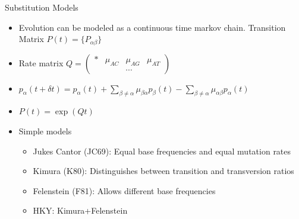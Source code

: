 \documentclass[10pt]{beamer}
\begin{document}
\begin{frame}[fragile]{Substitution Models}
\begin{itemize}
\item Evolution can be modeled as a continuous time markov chain. Transition Matrix $P(t) = \{P_{\alpha\beta}\}$
\item Rate matrix $Q = \begin{pmatrix} * & \mu_{AC} & \mu_{AG} & \mu_{AT}\\
& & \cdots \end{pmatrix}$
\item $p_\alpha(t+\delta t) = p_\alpha(t) + \sum_{\beta \neq \alpha }\mu_{\beta \alpha}p_\beta(t) - \sum_{\beta  \neq \alpha}\mu_{\alpha \beta} p_\alpha(t)$
\item $P(t) = \exp(Qt)$
\item Simple models 
\begin{itemize}
\item Jukes Cantor (JC69): Equal base frequencies and equal mutation rates
\item Kimura (K80): Distinguishes between transition and transversion ratios
\item Felenstein (F81): Allows different base frequencies
\item HKY: Kimura+Felenstein
\end{itemize}
\end{itemize}

\end{frame}

\end{document}
